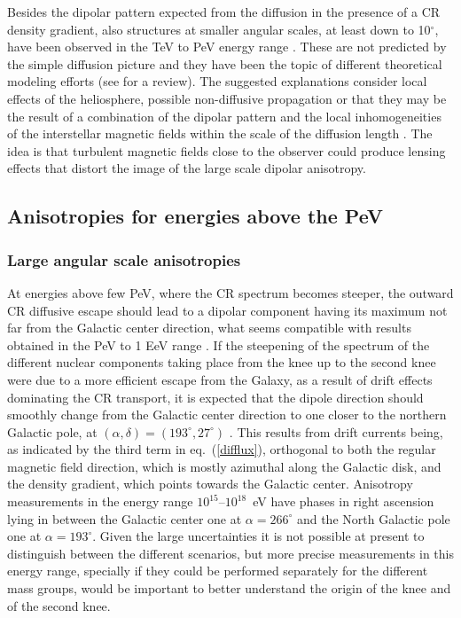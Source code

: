 \documentclass[twoside,12pt]{article}
\begin{document}
Besides the dipolar pattern expected from the diffusion in the presence of a CR density gradient, also structures at smaller angular scales, at least down to 10$^\circ$, have been observed in the TeV to PeV energy range \cite{milagro,argo,icsmall,hawc}. These are not predicted by the simple diffusion picture and they have been the topic of different theoretical modeling efforts (see \cite{am17} for a review).  The suggested explanations consider local effects of the heliosphere, possible non-diffusive propagation or that they may be the result of a combination of the dipolar pattern and the local inhomogeneities of the interstellar magnetic fields within the scale of the diffusion length \cite{gi12,ah14}. The idea is that turbulent  magnetic fields close to the observer could produce  lensing effects that distort the image of the large scale dipolar anisotropy.

\subsection{Anisotropies for energies above the PeV}

\subsubsection{Large angular scale anisotropies}

At energies above few PeV, where the CR spectrum becomes steeper, the outward CR diffusive escape should lead to a dipolar component having its maximum not far from the Galactic center direction, what seems compatible with results obtained in the PeV to 1 EeV range \cite{it13,ch16,LS12,LS11}. If the steepening of the spectrum of the different nuclear components taking place from the knee up to the second knee were due to a more efficient escape from the Galaxy, as a result of drift effects dominating the CR transport, it is expected that the dipole direction should smoothly change from the Galactic center  direction to one closer to the northern Galactic pole, at $(\alpha, \delta) = (193^\circ, 27^\circ)$ \cite{ca03}.
This results from drift currents being, as indicated by the third term in eq.~(\ref{difflux}), orthogonal to both the regular magnetic field direction, which is mostly azimuthal along the Galactic disk, and the density gradient, which points towards the Galactic center. Anisotropy measurements in the energy range $10^{15}$--$10^{18}$~eV have phases in right ascension lying in between the Galactic center one at $\alpha=266^\circ$ and the North Galactic pole one at $\alpha=193^\circ$. Given the large uncertainties it is not possible at present to distinguish between the different scenarios, but  more precise measurements in this energy range, specially if they could be performed separately for the different mass groups,  would be important to better understand the origin of the knee and of the second knee.
\end{document}
